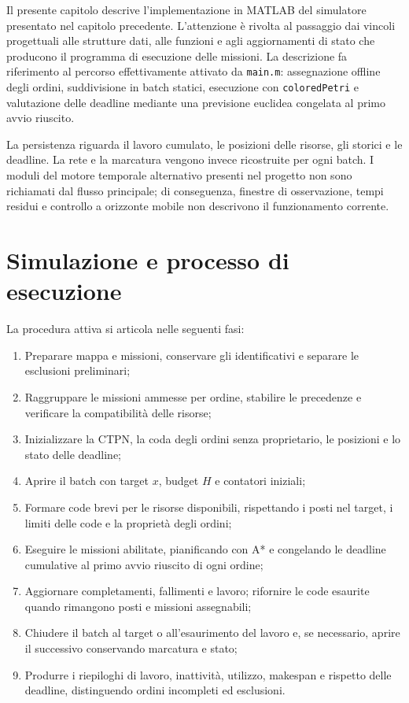 Il presente capitolo descrive l'implementazione in MATLAB del simulatore
presentato nel capitolo precedente. L'attenzione è rivolta al passaggio dai
vincoli progettuali alle strutture dati, alle funzioni e agli aggiornamenti
di stato che producono il programma di esecuzione delle missioni.
La descrizione fa riferimento al percorso effettivamente attivato da
\texttt{main.m}: assegnazione offline degli ordini, suddivisione in batch
statici, esecuzione con \texttt{colored\allowbreak Petri} e valutazione delle deadline
mediante una previsione euclidea congelata al primo avvio riuscito.

La persistenza riguarda il lavoro cumulato, le posizioni delle risorse,
gli storici e le deadline. La rete e la marcatura vengono invece ricostruite
per ogni batch. I moduli del motore temporale alternativo presenti nel
progetto non sono richiamati dal flusso principale; di conseguenza, finestre
di osservazione, tempi residui e controllo a orizzonte mobile non descrivono
il funzionamento corrente.

\section{Simulazione e processo di esecuzione}

La procedura attiva si articola nelle seguenti fasi:
\begin{enumerate}
	\item Preparare mappa e missioni, conservare gli identificativi e
	separare le esclusioni preliminari;
	\item Raggruppare le missioni ammesse per ordine, stabilire le precedenze
	e verificare la compatibilità delle risorse;
	\item Inizializzare la CTPN, la coda degli ordini senza proprietario,
	le posizioni e lo stato delle deadline;
	\item Aprire il batch con target $x$, budget $H$ e contatori iniziali;
	\item Formare code brevi per le risorse disponibili, rispettando i posti
	nel target, i limiti delle code e la proprietà degli ordini;
	\item Eseguire le missioni abilitate, pianificando con A* e congelando
	le deadline cumulative al primo avvio riuscito di ogni ordine;
	\item Aggiornare completamenti, fallimenti e lavoro; rifornire le code
	esaurite quando rimangono posti e missioni assegnabili;
	\item Chiudere il batch al target o all'esaurimento del lavoro e, se
	necessario, aprire il successivo conservando marcatura e stato;
	\item Produrre i riepiloghi di lavoro, inattività, utilizzo, makespan
	e rispetto delle deadline, distinguendo ordini incompleti ed esclusioni.
\end{enumerate}


